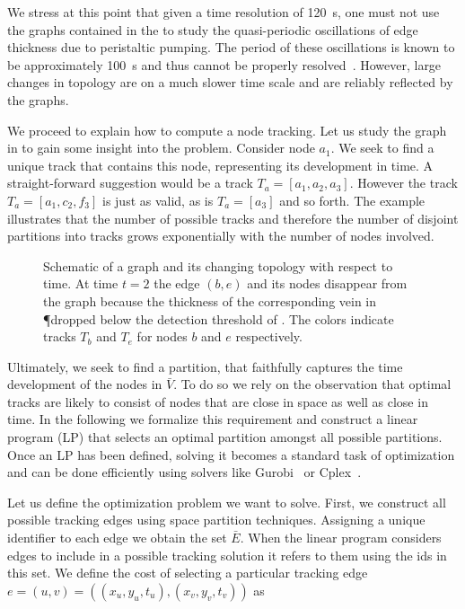 		We stress at this point that given a time resolution of \SI{120}{\second}, one must not use the graphs contained in the \data to study the quasi-periodic oscillations of edge thickness due to peristaltic pumping. The period of these oscillations is known to be approximately \SI{100}{\second} and thus cannot be properly resolved~\cite{stewart1959protoplasmic}. However, large changes in topology are on a much slower time scale and are reliably reflected by the graphs.

		We proceed to explain how to compute a node tracking. Let us study the graph in  to gain some insight into the problem. Consider \eg node $a_1$. We seek to find a unique track that contains this node, representing its development in time. A straight-forward suggestion would be a track $T_a = [a_1,a_2,a_3]$. However the track $T_a = [a_1,c_2,f_3]$ is just as valid, as is $T_a = [a_3]$ and so forth. The example illustrates that the number of possible tracks and therefore the number of disjoint partitions into tracks grows exponentially with the number of nodes involved. 


		\begin{figure}
		
		
		
		\caption[Schematic description of node tracking]{Schematic of a graph and its changing topology with respect to time. At time $t=2$ the edge $(b,e)$ and its nodes disappear from the graph because the thickness of the corresponding vein in \P dropped below the detection threshold of \NEFI. The colors indicate tracks $T_b$ and $T_e$ for nodes $b$ and $e$ respectively.}
		\label{fig:tracking}
		\end{figure}

		Ultimately, we seek to find a partition, that faithfully captures the time development of the nodes in $\bar{V}$. To do so we rely on the observation that optimal tracks are likely to consist of nodes that are close in space as well as close in time. In the following we formalize this requirement and construct a linear program (LP) that selects an optimal partition amongst all possible partitions. Once an LP has been defined, solving it becomes a standard task of optimization and can be done efficiently using solvers like Gurobi~\cite{optimization2012gurobi} or Cplex~\cite{cplex2005high}.

		Let us define the optimization problem we want to solve. First, we construct all possible tracking edges using space partition techniques. Assigning a unique identifier to each edge we obtain the set $\bar{E}$. When the linear program considers edges to include in a possible tracking solution it refers to them using the ids in this set. We define the cost of selecting a particular tracking edge $e = (u,v) = ((x_u,y_u,t_u), (x_v,y_v,t_v))$ as

